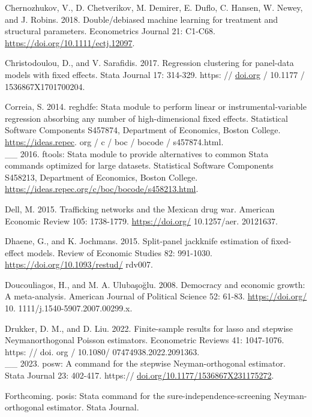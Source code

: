 \documentclass[10pt]{article}
\begin{document}
Chernozhukov, V., D. Chetverikov, M. Demirer, E. Duflo, C. Hansen, W. Newey, and J. Robins. 2018. Double/debiased machine learning for treatment and structural parameters. Econometrics Journal 21: C1-C68. \href{https://doi.org/10.1111/ectj.12097}{https://doi.org/10.1111/ectj.12097}.

Christodoulou, D., and V. Sarafidis. 2017. Regression clustering for panel-data models with fixed effects. Stata Journal 17: 314-329. https: // \href{http://doi.org}{doi.org} / 10.1177 / 1536867X1701700204.

Correia, S. 2014. reghdfe: Stata module to perform linear or instrumental-variable regression absorbing any number of high-dimensional fixed effects. Statistical Software Components S457874, Department of Economics, Boston College. \href{https://ideas.repec}{https://ideas.repec}. org / c / boc / bocode / s457874.html.\\
\_\_ 2016. ftools: Stata module to provide alternatives to common Stata commands optimized for large datasets. Statistical Software Components S458213, Department of Economics, Boston College. \href{https://ideas.repec.org/c/boc/bocode/s458213.html}{https://ideas.repec.org/c/boc/bocode/s458213.html}.

Dell, M. 2015. Trafficking networks and the Mexican drug war. American Economic Review 105: 1738-1779. \href{https://doi.org/}{https://doi.org/} 10.1257/aer. 20121637.

Dhaene, G., and K. Jochmans. 2015. Split-panel jackknife estimation of fixed-effect models. Review of Economic Studies 82: 991-1030. \href{https://doi.org/10.1093/restud/}{https://doi.org/10.1093/restud/} rdv007.

Doucouliagos, H., and M. A. Ulubaşoğlu. 2008. Democracy and economic growth: A meta-analysis. American Journal of Political Science 52: 61-83. \href{https://doi.org/}{https://doi.org/} 10. 1111/j.1540-5907.2007.00299.x.

Drukker, D. M., and D. Liu. 2022. Finite-sample results for lasso and stepwise Neymanorthogonal Poisson estimators. Econometric Reviews 41: 1047-1076. https: // doi. org / 10.1080/ 07474938.2022.2091363.\\
\_\_ 2023. posw: A command for the stepwise Neyman-orthogonal estimator. Stata Journal 23: 402-417. https:// \href{http://doi.org/10.1177/1536867X231175272}{doi.org/10.1177/1536867X231175272}.

Forthcoming. posis: Stata command for the sure-independence-screening Neyman-orthogonal estimator. Stata Journal.
\end{document}
